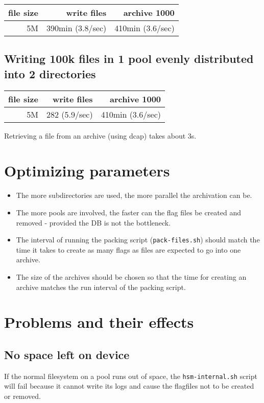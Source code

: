 \documentclass[a4paper,8pt]{scrartcl}
\begin{document}
\begin{tabular}{|r||r||r|}
  \hline
  file size & write files  & archive 1000 \\
  \hline
  5M        & 390min (3.8/sec) & 410min (3.6/sec) \\
  \hline
\end{tabular}

\subsection{Writing 100k files in 1 pool evenly distributed into 2 directories}

\begin{tabular}{|r||r||r|}
  \hline
  file size & write files  & archive 1000 \\
  \hline
  5M        & 282 (5.9/sec) & 410min (3.6/sec) \\
  \hline
\end{tabular}
Retrieving a file from an archive (using dcap) takes about 3s.

\section{Optimizing parameters}
\begin{itemize}
  \item The more subdirectories are used, the more parallel the archivation can
    be.
  \item The more pools are involved, the faster can the flag files be created
    and removed - provided the DB is not the bottleneck.
  \item The interval of running the packing script (\texttt{pack-files.sh})
    should match the time it takes to create as many flags as files are
    expected to go into one archive.
  \item The size of the archives should be chosen so that the time for creating
    an archive matches the run interval of the packing script.
\end{itemize}


\section{Problems and their effects}

\subsection{No space left on device}
If the normal filesystem on a pool runs out of space, the
\texttt{hsm-internal.sh} script will fail because it cannot write its logs and
cause the flagfiles not to be created or removed.
\end{document}
